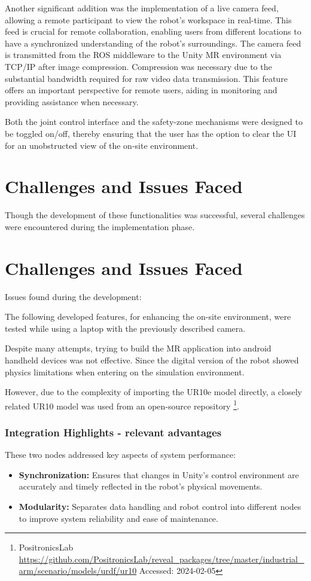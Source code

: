 Another significant addition was the implementation of a live camera feed, allowing a remote participant to view the robot’s workspace in real-time. This feed is crucial for remote collaboration, enabling users from different locations to have a synchronized understanding of the robot’s surroundings. The camera feed is transmitted from the \ac{ROS} middleware to the Unity \ac{MR} environment via \ac{TCP}/\ac{IP} after image compression. Compression was necessary due to the substantial bandwidth required for raw video data transmission. This feature offers an important perspective for remote users, aiding in monitoring and providing assistance when necessary.

Both the joint control interface and the safety-zone mechanisms were designed to be toggled on/off, thereby ensuring that the user has the option to clear the \ac{UI} for an unobstructed view of the on-site environment.

\section{Challenges and Issues Faced}

Though the development of these functionalities was successful, several challenges were encountered during the implementation phase. 




\section{Challenges and Issues Faced}
Issues found during the development:

The following developed features, for enhancing the on-site environment, were tested while using a laptop with the previously described camera.

    Despite many attempts, trying to build the \ac{MR} application into android handheld devices was not effective.
    Since the digital version of the robot showed physics limitations when entering on the simulation environment.


    However, due to the complexity of importing the UR10e model directly, a closely related UR10 model was used from an open-source repository \footnote{PositronicsLab \url{https://github.com/PositronicsLab/reveal_packages/tree/master/industrial_arm/scenario/models/urdf/ur10} Accessed: 2024-02-05}. 


    \subsubsection{Integration Highlights - relevant advantages}
    These two nodes addressed key aspects of system performance:
    \begin{itemize}
        \item \textbf{Synchronization:} Ensures that changes in Unity’s control environment are accurately and timely reflected in the robot's physical movements.
        \item \textbf{Modularity:} Separates data handling and robot control into different nodes to improve system reliability and ease of maintenance.
    \end{itemize}


